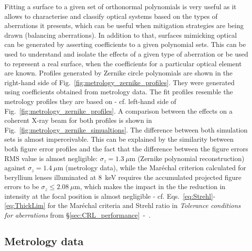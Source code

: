 \begin{refsection}
Fitting a surface to a given set of orthonormal polynomials is very useful as it allows to characterise and classify optical systems based on the types of aberrations it presents, which can be useful when mitigation strategies are being drawn (balancing aberrations). In addition to that, surfaces mimicking optical can be generated by asserting coefficients to a given polynomial sets. This can be used to understand and isolate the effects of a given type of aberration or be used to represent a real surface, when the coefficients for a particular optical element are known. Profiles generated by Zernike circle polynomials are shown in the right-hand side of Fig.~\ref{fig:metrology_zernike_profiles}. They were generated using coefficients obtained from metrology data. The fit profiles resemble the metrology profiles they are based on - cf. left-hand side of Fig.~\ref{fig:metrology_zernike_profiles}. A comparison between the effects on a coherent X-ray beam for both profiles is shown in Fig.~\ref{fig:metrology_zernike_simualtions}. The difference between both simulation sets is almost imperceivable. This can be explained by the similarity between both figure error profiles and the fact that the difference between the figure errors RMS value is almost negligible: $\sigma_z=1.3~\mu$m (Zernike polynomial reconstruction) against $\sigma_z=1.4~\mu$m (metrology data), while the Mar\'echal criterion calculated for beryllium lenses illuminated at $8$~keV requires the accumulated projected figure errors to be $\sigma_z\leq2.08~\mu$m, which makes the impact in the the reduction in intensity at the focal position is almost negligible - cf. Eqs.~\ref{eq:Strehl}-\ref{eq:ThickLim} for the Mar\'echal criteria and Strehl ratio in \textit{Tolerance conditions for aberrations} from \S\ref{sec:CRL_performance}~-~\textit{}.

\subsection{Metrology data}\label{sec:metrology_data}


\end{refsection}
